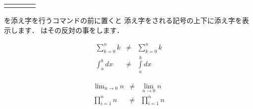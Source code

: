 \begin{Syntax}
\begin{tabular}{llll}
 \cmd{limits} &\pp{上下に付く} & \cmd{nolimits} &\pp{肩に付く}\\
\end{tabular}
\end{Syntax}
を添え字を行うコマンドの前に置くと
添え字をされる記号の上下に添え字を表示します．%
はその反対の事をします．
\begin{InOut}
\begin{eqnarray*}
\sum\nolimits^n_{k=0}k & \neq & 
   \sum^n_{k=0}k\\
\int^b_a dx & \neq &
   \int\limits^b_a dx
\end{eqnarray*}
\end{InOut}
%
\begin{InOut}
\begin{eqnarray*}
\lim\nolimits_{n\rightarrow0}n 
  &\neq& \lim_{n\rightarrow0}n \\
\prod^n_{i=1}n &\neq& 
   \prod\nolimits^n_{i=1}n
\end{eqnarray*}
\end{InOut}
 
